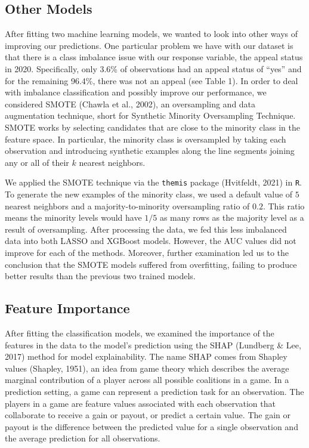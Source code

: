 \documentclass[
  12pt,
]{article}
\begin{document}
\hypertarget{other-models}{%
\subsection{Other Models}\label{other-models}}

After fitting two machine learning models, we wanted to look into other
ways of improving our predictions. One particular problem we have with
our dataset is that there is a class imbalance issue with our response
variable, the appeal status in 2020. Specifically, only 3.6\% of
observations had an appeal status of ``yes'' and for the remaining
96.4\%, there was not an appeal (see Table 1). In order to deal with imbalance
classification and possibly improve our performance, we considered SMOTE
(Chawla et al., 2002), an oversampling and data augmentation technique,
short for Synthetic Minority Oversampling Technique. SMOTE works by
selecting candidates that are close to the minority class in the feature
space. In particular, the minority class is oversampled by taking each
observation and introducing synthetic examples along the line segments
joining any or all of their \(k\) nearest neighbors.

We applied the SMOTE technique via the \texttt{themis} package
(Hvitfeldt, 2021) in \texttt{R}. To generate the new examples of the
minority class, we used a default value of \(5\) nearest neighbors and a
majority-to-minority oversampling ratio of \(0.2\). This ratio means the
minority levels would have \(1/5\) as many rows as the majority level as
a result of oversampling. After processing the data, we fed this less
imbalanced data into both LASSO and XGBoost models. However, the AUC
values did not improve for each of the methods. Moreover, further
examination led us to the conclusion that the SMOTE models suffered from
overfitting, failing to produce better results than the previous two
trained models.

\hypertarget{feature-importance}{%
\subsection{Feature Importance}\label{feature-importance}}

After fitting the classification models, we examined the importance of
the features in the data to the model's prediction using the SHAP
(Lundberg \& Lee, 2017) method for model explainability. The name SHAP
comes from Shapley values (Shapley, 1951), an idea from game theory
which describes the average marginal contribution of a player across all
possible coalitions in a game. In a prediction setting, a game can
represent a prediction task for an observation. The players in a game
are feature values associated with each observation that collaborate to
receive a gain or payout, or predict a certain value. The gain or payout
is the difference between the predicted value for a single observation
and the average prediction for all observations.
\end{document}
